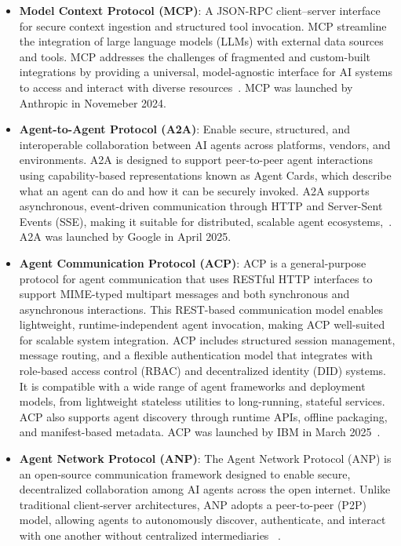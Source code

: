 \documentclass{article}
\begin{document}
\begin{itemize}
  \item \textbf{Model Context Protocol (MCP)}: A JSON-RPC client–server interface for secure context ingestion and structured tool invocation. MCP streamline the integration of large language models (LLMs) with external data sources and tools. MCP addresses the challenges of fragmented and custom-built integrations by providing a universal, model-agnostic interface for AI systems to access and interact with diverse resources~\cite{mcp2024introduction,singh2025mcp,ray2025mcp}. MCP was launched by Anthropic in Novemeber 2024.
  \item \textbf{Agent-to-Agent Protocol (A2A)}: Enable secure, structured, and interoperable collaboration between AI agents across platforms, vendors, and environments. A2A is designed to support peer-to-peer agent interactions using capability-based representations known as Agent Cards, which describe what an agent can do and how it can be securely invoked. A2A supports asynchronous, event-driven communication through HTTP and Server-Sent Events (SSE), making it suitable for distributed, scalable agent ecosystems,~\cite{google2024a2a}. A2A was launched by Google in April 2025.
  \item \textbf{Agent Communication Protocol (ACP)}: ACP is a general-purpose protocol for agent communication that uses RESTful HTTP interfaces to support MIME-typed multipart messages and both synchronous and asynchronous interactions. This REST-based communication model enables lightweight, runtime-independent agent invocation, making ACP well-suited for scalable system integration. ACP includes structured session management, message routing, and a flexible authentication model that integrates with role-based access control (RBAC) and decentralized identity (DID) systems. It is compatible with a wide range of agent frameworks and deployment models, from lightweight stateless utilities to long-running, stateful services. ACP also supports agent discovery through runtime APIs, offline packaging, and manifest-based metadata. ACP was launched by IBM in March 2025~\cite{beeai2024acp}.
  \item \textbf{Agent Network Protocol (ANP)}: The Agent Network Protocol (ANP) is an open-source communication framework designed to enable secure, decentralized collaboration among AI agents across the open internet. Unlike traditional client-server architectures, ANP adopts a peer-to-peer (P2P) model, allowing agents to autonomously discover, authenticate, and interact with one another without centralized intermediaries ~\cite{anp2024github, anp2024website}.
\end{itemize}
\end{document}
